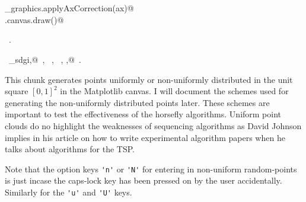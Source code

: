 \documentclass[11.5pt]{report}
\begin{document}
\begin{flushleft}
\begin{minipage}{\linewidth}
\begin{list}{}{}
\mbox{}\verb@@\\
\mbox{}\verb@@\\
\mbox{}\verb@utils_graphics.applyAxCorrection(ax)@\\
\mbox{}\verb@fig.canvas.draw()@\\
\mbox{}\verb@@{\NWsep}
\end{list}
\vspace{-1.5ex}
\footnotesize
\begin{list}{}{\setlength{\itemsep}{-\parsep}\setlength{\itemindent}{-\leftmargin}}
\item \NWtxtMacroRefIn\ .
\item \NWtxtIdentsUsed\nobreak\  \verb@algo_sdgi,@\nobreak\ , \verb@getTour@\nobreak\ , \verb@nof@\nobreak\ , \verb@phi,@\nobreak\ .
\item{}
\end{list}
\end{minipage}\vspace{4ex}
\end{flushleft}

\vspace{-0.8cm}\newchunk This chunk generates points uniformly or non-uniformly distributed in the 
unit square $[0,1]^2$ in the Matplotlib canvas. I will document the schemes used for 
generating the non-uniformly distributed points later. These schemes are important to test the effectiveness of 
the horsefly algorithms. Uniform point clouds do no highlight the weaknesses of 
sequencing algorithms as David Johnson implies in his article on how to write 
experimental algorithm papers when he talks about algorithms for the TSP. 

Note that the option keys \verb|'n'| or \verb|'N'| for entering in non-uniform random-points is just 
incase the caps-lock key has been pressed on by the user accidentally. Similarly for the \verb|'u'|
and \verb|'U'| keys.  
\end{document}
